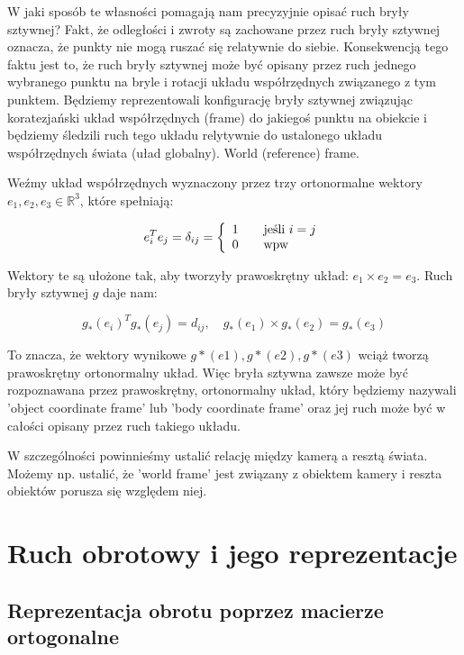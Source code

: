 \documentclass[a4paper,12pt]{article}
\newcommand{\RR}{\mathbb{R}^3}
\begin{document}
W jaki sposób te własności pomagają nam precyzyjnie opisać ruch bryły sztywnej? Fakt, że odległości i zwroty są zachowane przez ruch bryły sztywnej oznacza, że punkty nie mogą ruszać się relatywnie do siebie. Konsekwencją tego faktu jest to, że ruch bryły sztywnej może być opisany przez ruch jednego wybranego punktu na bryle i rotacji układu współrzędnych związanego z tym punktem. Będziemy reprezentowali konfigurację bryły sztywnej związując koratezjański układ współrzędnych (frame) do jakiegoś punktu na obiekcie i będziemy śledzili ruch tego układu relytywnie do ustalonego układu współrzędnych świata (uład globalny). World (reference) frame.

Weźmy układ współrzędnych wyznaczony przez trzy ortonormalne wektory $e_1,e_2,e_3 \in \RR$, które spełniają:

\begin{equation}
e^T_ie_j = \delta_{ij} = \left\{
  \begin{array}{l l}
    1 & \quad \text{jeśli $i=j$}\\
    0 & \quad \text{wpw}\\
  \end{array} \right.
\end{equation}

Wektory te są ułożone tak, aby tworzyły prawoskrętny układ: $e_1 \times e_2 = e_3$. Ruch bryły sztywnej $g$ daje nam:

\begin{equation}
g_*(e_i)^Tg_*(e_j) = d_{ij}, \quad g_*(e_1) \times g_*(e_2) = g_*(e_3)
\end{equation}

To znacza, że wektory wynikowe $g*(e1),g*(e2),g*(e3)$ wciąż tworzą prawoskrętny ortonormalny układ. Więc bryła sztywna zawsze może być rozpoznawana przez prawoskrętny, ortonormalny układ, który będziemy nazywali 'object coordinate frame' lub 'body coordinate frame' oraz jej ruch może być w całości opisany przez ruch takiego układu.

W szczególności powinnieśmy ustalić relację między kamerą a resztą świata. Możemy np. ustalić, że 'world frame' jest związany z obiektem kamery i reszta obiektów porusza się względem niej.


\section{Ruch obrotowy i jego reprezentacje}

\subsection{Reprezentacja obrotu poprzez macierze ortogonalne}
\end{document}
